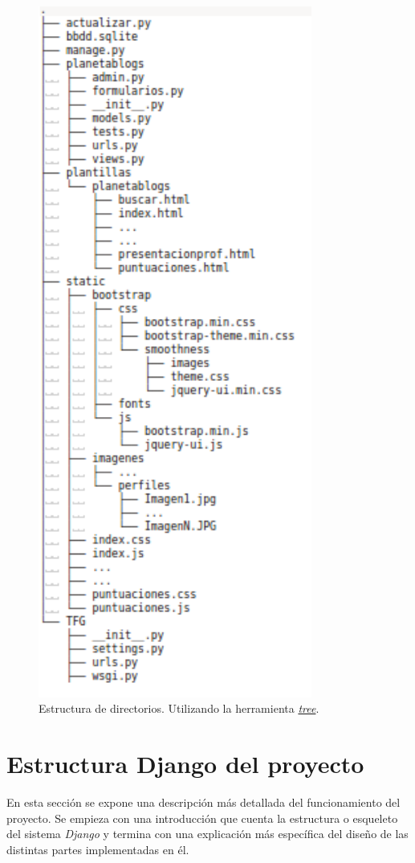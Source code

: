\documentclass[a4paper, 12pt]{book}
\begin{document}
\begin{figure}
  \centering
  \includegraphics[width=9cm, keepaspectratio]{img/tree}
  \caption{Estructura de directorios. Utilizando la herramienta \href{http://www.computerhope.com/unix/tree.htm}{\textit{tree}}.}
  \label{fig:arquitectura}
\end{figure}


\section{Estructura Django del proyecto} 
\label{sec:estructuradjango}
En esta secci\'on se expone una descripci\'on m\'as detallada del funcionamiento del proyecto. Se empieza con una introducci\'on que cuenta la estructura
o esqueleto del sistema \textit{Django} y termina con una explicaci\'on m\'as espec\'ifica del dise\~no de las distintas partes implementadas en \'el.
\end{document}
